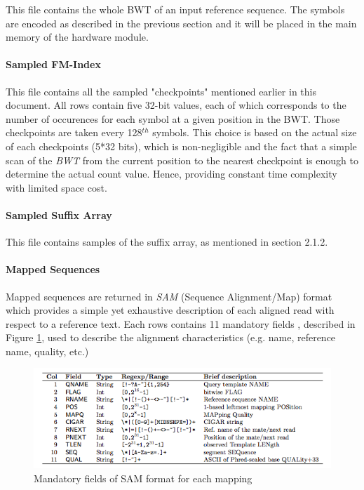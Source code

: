 This file contains the whole BWT of an input reference sequence. The symbols are encoded as described in the previous section and it will be placed in the main memory of the hardware module.

\paragraph{Sampled FM-Index}

This file contains all the sampled "checkpoints" mentioned earlier in this document. All rows contain five 32-bit values, each of which corresponds to the number of occurences for each symbol at a given position in the BWT. Those checkpoints are taken every 128$^{th}$ symbols. This choice is based on the actual size of each checkpoints (5*32 bits), which is non-negligible and the fact that a simple scan of the \textit{BWT} from the current position to the nearest checkpoint is enough to determine the actual count value. Hence, providing constant time complexity with limited space cost.

\paragraph{Sampled Suffix Array}

This file contains samples of the suffix array, as mentioned in section 2.1.2.

\paragraph{Mapped Sequences}

Mapped sequences are returned in \textsl{SAM}  (Sequence Alignment/Map) format which provides a simple yet exhaustive description of each aligned read with respect to a reference text. Each rows contains 11 mandatory fields
, described in Figure \ref{fig:samf}, used to describe the alignment characteristics (e.g. name, reference name, quality, etc.) \\

\begin{figure}[H]
    \centering
    \includegraphics[scale = 0.78]{Figures/SAMv1_3.png}
    \caption{Mandatory fields of SAM format for each mapping}
    \label{fig:samf}
\end{figure}
\vspace*{4mm}

